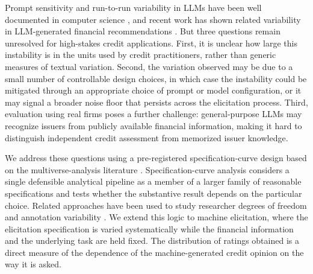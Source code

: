 \documentclass[a4paper,fleqn]{cas-sc}
\begin{document}
Prompt sensitivity and run-to-run variability in LLMs have been well documented in computer science
\citep{atil2024nondeterminism,kaplan2020scaling}, and recent work has shown related variability in
LLM-generated financial recommendations \citep{chon2025variability}. But three questions remain
unresolved for high-stakes credit applications. First, it is unclear how large this
instability is in the units used by credit practitioners, rather than generic measures of textual
variation. Second, the variation observed may be due to a small number of controllable design choices,
in which case the instability could be mitigated through an appropriate choice of prompt or model
configuration, or it may signal a broader noise floor that persists across the elicitation process. Third,
evaluation using real firms poses a further challenge: general-purpose LLMs may recognize issuers from
publicly available financial information, making it hard to distinguish independent credit assessment
from memorized issuer knowledge.

We address these questions using a pre-registered specification-curve design based on the
multiverse-analysis literature \citep{simonsohn2020specification,steegen2016multiverse}.
Specification-curve analysis considers a single defensible analytical pipeline as a member of a larger
family of reasonable specifications and tests whether the substantive result depends on the particular
choice. Related approaches have been used to study researcher degrees of freedom and annotation
variability \citep{camuffo2026variance}. We extend this logic to machine elicitation, where the
elicitation specification is varied systematically while the financial information and the underlying
task are held fixed. The distribution of ratings obtained is a direct measure of the dependence of the
machine-generated credit opinion on the way it is asked.
\end{document}

